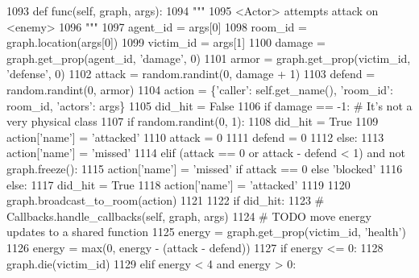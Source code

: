 \begin{DoxyCode}
1093     \textcolor{keyword}{def }func(self, graph, args):
1094         \textcolor{stringliteral}{"""}
1095 \textcolor{stringliteral}{        <Actor> attempts attack on <enemy>}
1096 \textcolor{stringliteral}{        """}
1097         agent\_id = args[0]
1098         room\_id = graph.location(args[0])
1099         victim\_id = args[1]
1100         damage = graph.get\_prop(agent\_id, \textcolor{stringliteral}{'damage'}, 0)
1101         armor = graph.get\_prop(victim\_id, \textcolor{stringliteral}{'defense'}, 0)
1102         attack = random.randint(0, damage + 1)
1103         defend = random.randint(0, armor)
1104         action = \{\textcolor{stringliteral}{'caller'}: self.get\_name(), \textcolor{stringliteral}{'room\_id'}: room\_id, \textcolor{stringliteral}{'actors'}: args\}
1105         did\_hit = \textcolor{keyword}{False}
1106         \textcolor{keywordflow}{if} damage == -1:  \textcolor{comment}{# It's not a very physical class}
1107             \textcolor{keywordflow}{if} random.randint(0, 1):
1108                 did\_hit = \textcolor{keyword}{True}
1109                 action[\textcolor{stringliteral}{'name'}] = \textcolor{stringliteral}{'attacked'}
1110                 attack = 0
1111                 defend = 0
1112             \textcolor{keywordflow}{else}:
1113                 action[\textcolor{stringliteral}{'name'}] = \textcolor{stringliteral}{'missed'}
1114         \textcolor{keywordflow}{elif} (attack == 0 \textcolor{keywordflow}{or} attack - defend < 1) \textcolor{keywordflow}{and} \textcolor{keywordflow}{not} graph.freeze():
1115             action[\textcolor{stringliteral}{'name'}] = \textcolor{stringliteral}{'missed'} \textcolor{keywordflow}{if} attack == 0 \textcolor{keywordflow}{else} \textcolor{stringliteral}{'blocked'}
1116         \textcolor{keywordflow}{else}:
1117             did\_hit = \textcolor{keyword}{True}
1118             action[\textcolor{stringliteral}{'name'}] = \textcolor{stringliteral}{'attacked'}
1119 
1120         graph.broadcast\_to\_room(action)
1121 
1122         \textcolor{keywordflow}{if} did\_hit:
1123             \textcolor{comment}{# Callbacks.handle\_callbacks(self, graph, args)}
1124             \textcolor{comment}{# TODO move energy updates to a shared function}
1125             energy = graph.get\_prop(victim\_id, \textcolor{stringliteral}{'health'})
1126             energy = max(0, energy - (attack - defend))
1127             \textcolor{keywordflow}{if} energy <= 0:
1128                 graph.die(victim\_id)
1129             \textcolor{keywordflow}{elif} energy < 4 \textcolor{keywordflow}{and} energy > 0:

\end{DoxyCode}
